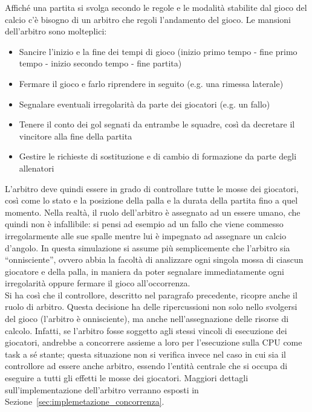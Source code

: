 Affiché una partita si svolga secondo le regole e le modalità stabilite dal gioco del calcio c'è bisogno di un arbitro che regoli l'andamento del gioco. Le mansioni dell'arbitro sono molteplici:

\begin{itemize}
	\item Sancire l'inizio e la fine dei tempi di gioco (inizio primo tempo - fine primo tempo - inizio secondo tempo - fine partita)
	\item Fermare il gioco e farlo riprendere in seguito (e.g. una rimessa laterale)
	\item Segnalare eventuali irregolarità da parte dei giocatori (e.g. un fallo)
	\item Tenere il conto dei gol segnati da entrambe le squadre, così da decretare il vincitore alla fine della partita
	\item Gestire le richieste di sostituzione e di cambio di formazione da parte degli allenatori
\end{itemize}

L'arbitro deve quindi essere in grado di controllare tutte le mosse dei giocatori, così come lo stato e la posizione della palla e la durata della partita fino a quel momento. Nella realtà, il ruolo dell'arbitro è assegnato ad un essere umano, che quindi non è infallibile: si pensi ad esempio ad un fallo che viene commesso irregolarmente alle sue spalle mentre lui è impegnato ad assegnare un calcio d'angolo. In questa simulazione si assume più semplicemente che l'arbitro sia ``onnisciente'', ovvero abbia la facoltà di analizzare ogni singola mossa di ciascun giocatore e della palla, in maniera da poter segnalare immediatamente ogni irregolarità oppure fermare il gioco all'occorrenza.\\

Si ha così che il controllore, descritto nel paragrafo precedente, ricopre anche il ruolo di arbitro. Questa decisione ha delle ripercussioni non solo nello svolgersi del gioco (l'arbitro è onnisciente), ma anche nell'assegnazione delle risorse di calcolo. Infatti, se l'arbitro fosse soggetto agli stessi vincoli di esecuzione dei giocatori, andrebbe a concorrere assieme a loro per l'esecuzione sulla CPU come task a sé stante; questa situazione non si verifica invece nel caso in cui sia il controllore ad essere anche arbitro, essendo l'entità centrale che si occupa di eseguire a tutti gli effetti le mosse dei giocatori. Maggiori dettagli sull'implementazione dell'arbitro verranno esposti in Sezione~\ref{sec:implemetazione_concorrenza}.\\

